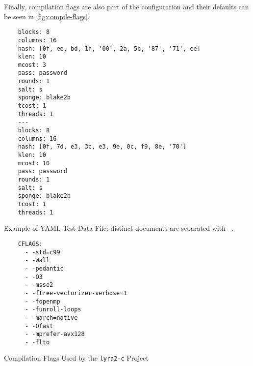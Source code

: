 Finally, compilation flags are also part of the configuration and their defaults can be seen in \autoref{fig:compile-flags}.

\begin{listing}
    \begin{verbatim}
    blocks: 8
    columns: 16
    hash: [0f, ee, bd, 1f, '00', 2a, 5b, '87', '71', ee]
    klen: 10
    mcost: 3
    pass: password
    rounds: 1
    salt: s
    sponge: blake2b
    tcost: 1
    threads: 1
    ---
    blocks: 8
    columns: 16
    hash: [0f, 7d, e3, 3c, e3, 9e, 0c, f9, 8e, '70']
    klen: 10
    mcost: 10
    pass: password
    rounds: 1
    salt: s
    sponge: blake2b
    tcost: 1
    threads: 1
    \end{verbatim}
    \caption{Example of YAML Test Data File: distinct documents are separated with \texttt{---}.}
    \label{fig:yaml-data}
\end{listing}


\begin{listing}
    \begin{verbatim}
    CFLAGS:
      - -std=c99
      - -Wall
      - -pedantic
      - -O3
      - -msse2
      - -ftree-vectorizer-verbose=1
      - -fopenmp
      - -funroll-loops
      - -march=native
      - -Ofast
      - -mprefer-avx128
      - -flto
      \end{verbatim}
      \caption{Compilation Flags Used by the \texttt{lyra2-c} Project}
      \label{fig:compile-flags}
  \end{listing}
